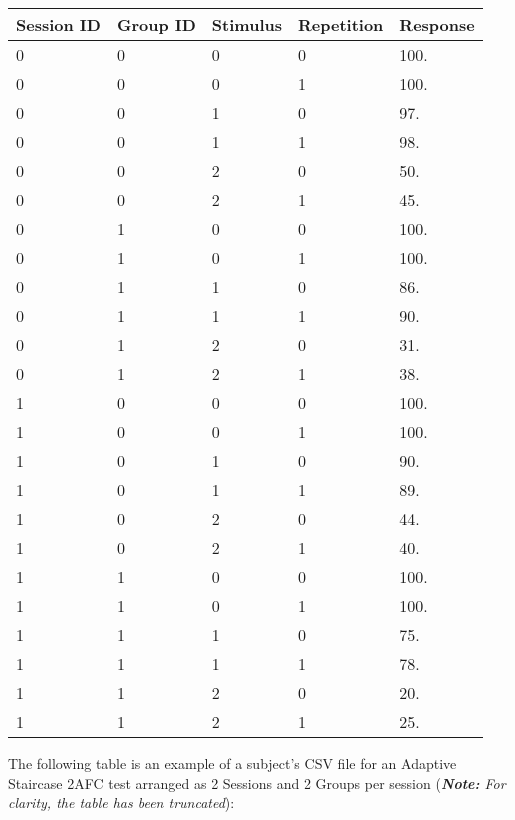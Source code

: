 \begin{center}
	\begin{tabularx}{\textwidth}{|X|X|X|X|X|}
		\hline
		\textbf{Session ID} & \textbf{Group ID} & \textbf{Stimulus} & \textbf{Repetition} & \textbf{Response} \\
		\hline
		0 & 0 & 0 & 0 & 100. \\
		0 & 0 & 0 & 1 & 100. \\
		0 & 0 & 1 & 0 & 97. \\
		0 & 0 & 1 & 1 & 98. \\
		0 & 0 & 2 & 0 & 50. \\
		0 & 0 & 2 & 1 & 45. \\
		\hline
		0 & 1 & 0 & 0 & 100. \\
		0 & 1 & 0 & 1 & 100. \\
		0 & 1 & 1 & 0 & 86. \\
		0 & 1 & 1 & 1 & 90. \\
		0 & 1 & 2 & 0 & 31. \\
		0 & 1 & 2 & 1 & 38. \\
		\hline
		1 & 0 & 0 & 0 & 100. \\
		1 & 0 & 0 & 1 & 100. \\
		1 & 0 & 1 & 0 & 90. \\
		1 & 0 & 1 & 1 & 89. \\
		1 & 0 & 2 & 0 & 44. \\
		1 & 0 & 2 & 1 & 40. \\
		\hline
		1 & 1 & 0 & 0 & 100. \\
		1 & 1 & 0 & 1 & 100. \\
		1 & 1 & 1 & 0 & 75. \\
		1 & 1 & 1 & 1 & 78. \\
		1 & 1 & 2 & 0 & 20. \\
		1 & 1 & 2 & 1 & 25. \\
		\hline
	\end{tabularx}
\end{center}

\pagebreak
The following table is an example of a subject's CSV file for an Adaptive Staircase 2AFC test arranged as 2 Sessions and 2 Groups per session (\textit{\textbf{Note:} For clarity, the table has been truncated}):

